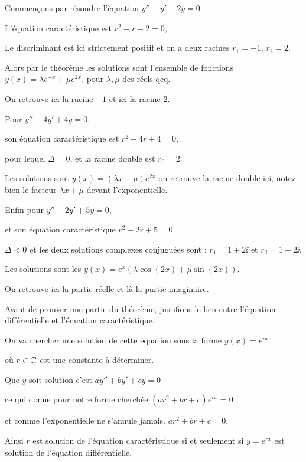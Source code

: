 Commençons par résoudre l'équation $y'' - y' - 2y = 0$.

\change
L'équation caractéristique est $r^2 - r - 2 = 0$,  

\change
Le discriminant est ici strictement positif et on a deux racines
$r_1 = -1$, $r_2 = 2$.

\change
Alors par le théorème les solutions 
sont l'ensemble de fonctions
 $y(x) = \lambda e^{-x} + \mu e^{2x}$,
 pour $\lambda,\mu$ des réels qcq.
 
 On retrouve ici la racine $-1$ et ici la racine $2$.
 
\change
Pour $y'' - 4y' + 4y = 0$.

\change
son équation caractéristique est $r^2 - 4r + 4 = 0$,

\change
pour lequel $\Delta=0$, et la racine double est $r_0=2$.

\change
Les solutions sont $y(x) = (\lambda x + \mu) e^{2x}$
on retrouve la racine double ici, 
notez bien le facteur $\lambda x + \mu$ devant l'exponentielle.

\change
Enfin pour $y'' - 2y' + 5y = 0$,

\change
et son équation caractéristique $r^2-2r+5 = 0$

\change
$\Delta<0$ et les deux solutions complexes conjuguées sont :
$r_1 = 1 + 2\ii$ et $r_2 = 1 - 2\ii$.

\change 
Les solutions sont les 
$y(x) = e^x (\lambda \cos(2x) + \mu \sin(2x))$.

On retrouve ici la partie réelle et là la partie imaginaire.




\diapo

Avant de prouver une partie du théorème, justifions le lien entre l'équation différentielle
et l'équation caractéristique.

\change
On va chercher une solution de cette équation sous la forme 
$y(x)=e^{rx}$

\change où $r \in \mathbb{C}$ est une constante à déterminer. 

\change
Que $y$ soit solution
c'est $ay''+by'+cy=0$ 

\change
ce qui donne pour notre forme cherchée
$(ar^2+br+c)e^{rx}=0$

\change
et comme l'exponentielle ne s'annule jamais.
$ar^2+br+c=0$.

Ainsi $r$ est solution de l'équation caractéristique si et seulement si
$y=e^{rx}$ est solution de l'équation différentielle.


